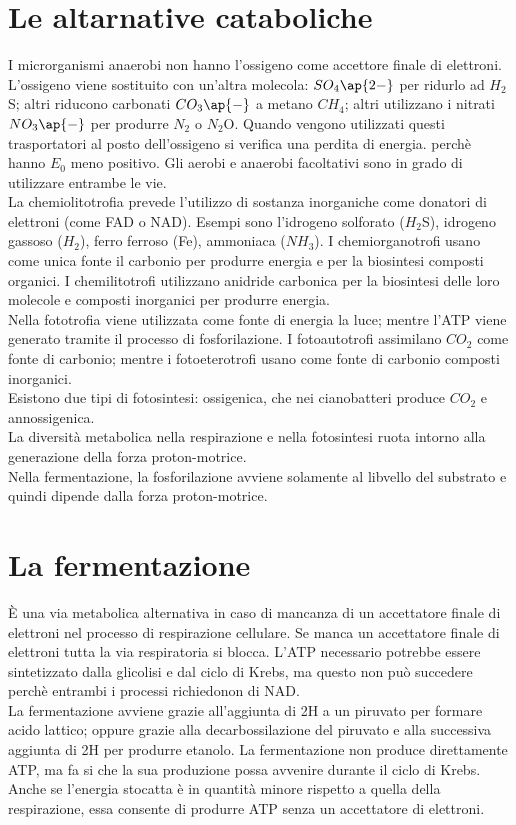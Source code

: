 \section{Le altarnative cataboliche}
I microrganismi anaerobi non hanno l'ossigeno come accettore finale di elettroni. L'ossigeno viene sostituito con un'altra molecola: $SO_4\ap{2-}$ per ridurlo ad $H_2$S; altri riducono carbonati $CO_3\ap{-}$ a metano $CH_4$; altri utilizzano i nitrati $NO_3\ap{-}$ per produrre $N_2$ o $N_2$O. Quando vengono utilizzati questi trasportatori al posto dell'ossigeno si verifica una perdita di energia. perch\`e hanno $E_0$ meno positivo. Gli aerobi e anaerobi facoltativi sono in grado di utilizzare entrambe le vie.
\\La chemiolitotrofia prevede l'utilizzo di sostanza inorganiche come donatori di elettroni (come FAD o NAD). Esempi sono l'idrogeno solforato ($H_2$S), idrogeno gassoso ($H_2$), ferro ferroso (Fe), ammoniaca ($NH_3$). I chemiorganotrofi usano come unica fonte il carbonio per produrre energia e per la biosintesi composti organici. I chemilitotrofi utilizzano anidride carbonica per la biosintesi delle loro molecole e composti inorganici per produrre energia. 
\\Nella fototrofia viene utilizzata come fonte di energia la luce; mentre l'ATP viene generato tramite il processo di fosforilazione. I fotoautotrofi assimilano $CO_2$ come fonte di carbonio; mentre i fotoeterotrofi usano come fonte di carbonio composti inorganici. 
\\Esistono due tipi di fotosintesi: ossigenica, che nei cianobatteri produce $CO_2$ e annossigenica.
\\La diversit\`a metabolica nella respirazione e nella fotosintesi ruota intorno alla generazione della forza proton-motrice. \\Nella fermentazione, la fosforilazione avviene solamente al libvello del substrato e quindi dipende dalla forza proton-motrice.
\section{La fermentazione}
\`E una via metabolica alternativa in caso di mancanza di un accettatore finale di elettroni nel processo di respirazione cellulare. Se manca un accettatore finale di elettroni tutta la via respiratoria si blocca. L'ATP necessario potrebbe essere sintetizzato dalla glicolisi e dal ciclo di Krebs, ma questo non pu\`o succedere perch\`e entrambi i processi richiedonon di NAD\ap{+}. 
\\La fermentazione avviene grazie all'aggiunta di 2H a un piruvato per formare acido lattico; oppure grazie alla decarbossilazione del piruvato e alla successiva aggiunta di 2H per produrre etanolo. La fermentazione non produce direttamente ATP, ma fa si che la sua produzione possa avvenire durante il ciclo di Krebs. Anche se l'energia stocatta \`e in quantit\`a minore rispetto a quella della respirazione, essa consente di produrre ATP senza un accettatore di elettroni. 
